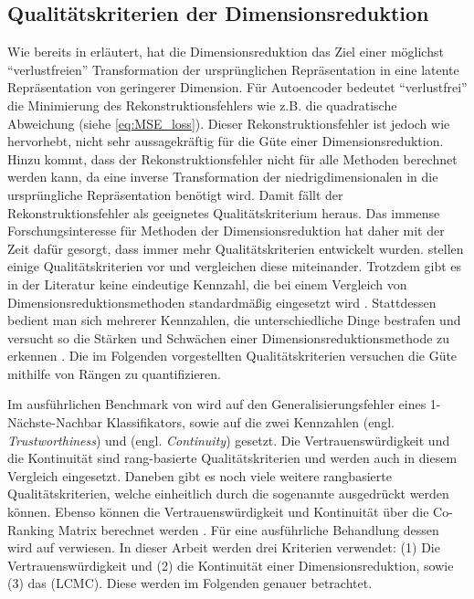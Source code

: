\subsection{Qualitätskriterien der Dimensionsreduktion}
\label{ch:Vergleich:sec:Methodik:subsec:Qualitaetskriterien}
Wie bereits in  erläutert, hat die Dimensionsreduktion das Ziel einer möglichst \enquote{verlustfreien} Transformation der ursprünglichen Repräsentation in eine latente Repräsentation von geringerer Dimension. Für Autoencoder bedeutet \enquote{verlustfrei} die Minimierung des Rekonstruktionsfehlers wie z.B. die quadratische Abweichung (siehe \eqref{eq:MSE_loss}). Dieser Rekonstruktionsfehler ist jedoch wie \textcite[18]{vanderMaaten.2009} hervorhebt, nicht sehr aussagekräftig für die Güte einer Dimensionsreduktion. Hinzu kommt, dass der Rekonstruktionsfehler nicht für alle Methoden berechnet werden kann, da eine inverse Transformation der niedrigdimensionalen in die ursprüngliche Repräsentation benötigt wird. Damit fällt der Rekonstruktionsfehler als geeignetes Qualitätskriterium heraus. Das immense Forschungsinteresse für Methoden der Dimensionsreduktion hat daher mit der Zeit dafür gesorgt, dass immer mehr Qualitätskriterien entwickelt wurden. \textcite{Gracia.2014} stellen einige Qualitätskriterien vor und vergleichen diese miteinander. Trotzdem gibt es in der Literatur keine eindeutige Kennzahl, die bei einem Vergleich von Dimensionsreduktionsmethoden standardmäßig eingesetzt wird \parencite[vgl.][1 -- 2]{Lee.2009}. Stattdessen bedient man sich mehrerer Kennzahlen, die
unterschiedliche Dinge bestrafen und versucht so die Stärken und Schwächen einer
Dimensionsreduktionsmethode zu erkennen \parencite[486]{Venna.2001}. Die im Folgenden vorgestellten Qualitätskriterien versuchen die Güte
mithilfe von Rängen zu quantifizieren.

Im ausführlichen Benchmark von \textcite{vanderMaaten.2009} wird auf den Generalisierungsfehler
eines 1-Nächste-Nachbar Klassifikators, sowie auf die zwei Kennzahlen
 (engl. \textit{Trustworthiness}) und  (engl.
\textit{Continuity}) \parencites{Venna.2001}{Venna.2006} gesetzt. Die Vertrauenswürdigkeit und die Kontinuität sind
rang-basierte Qualitätskriterien und werden auch in diesem Vergleich eingesetzt. Daneben gibt es
noch viele weitere rangbasierte Qualitätskriterien, welche einheitlich durch die sogenannte
 \parencite[1432]{Lee.2009} ausgedrückt werden können. Ebenso können die Vertrauenswürdigkeit und
Kontinuität über die Co-Ranking Matrix berechnet werden \parencite[1433]{Lee.2009}. Für eine ausführliche Behandlung dessen wird auf \textcite{Lee.2009}
verwiesen. In dieser Arbeit werden drei Kriterien verwendet: (1) Die Vertrauenswürdigkeit und (2)
die Kontinuität einer Dimensionsreduktion, sowie (3) das 
(LCMC). Diese werden im Folgenden genauer betrachtet. 
